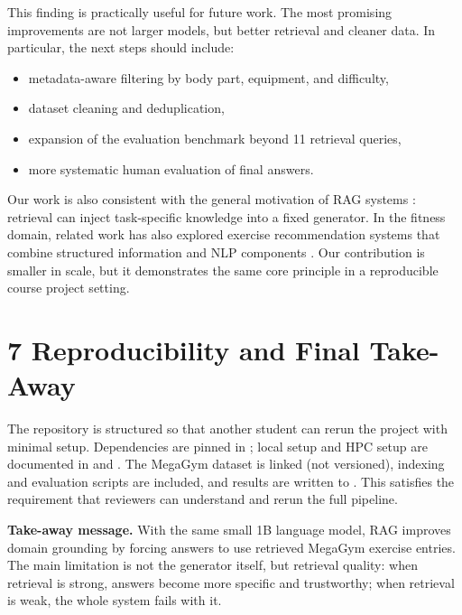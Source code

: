 \documentclass[fleqn,moreauthors,10pt]{ds_report}
\begin{document}
This finding is practically useful for future work. The most promising improvements are not larger models, but better retrieval and cleaner data. In particular, the next steps should include:

\begin{itemize}
\item metadata-aware filtering by body part, equipment, and difficulty,
\item dataset cleaning and deduplication,
\item expansion of the evaluation benchmark beyond 11 retrieval queries,
\item more systematic human evaluation of final answers.
\end{itemize}

Our work is also consistent with the general motivation of RAG systems \cite{Lewis2020}: retrieval can inject task-specific knowledge into a fixed generator. In the fitness domain, related work has also explored exercise recommendation systems that combine structured information and NLP components \cite{Yang2023}. Our contribution is smaller in scale, but it demonstrates the same core principle in a reproducible course project setting.

\section*{7 Reproducibility and Final Take-Away}

The repository is structured so that another student can rerun the project with minimal setup. Dependencies are pinned in ; local setup and HPC setup are documented in  and . The MegaGym dataset is linked (not versioned), indexing and evaluation scripts are included, and results are written to . This satisfies the requirement that reviewers can understand and rerun the full pipeline.

\textbf{Take-away message.} With the same small 1B language model, RAG improves domain grounding by forcing answers to use retrieved MegaGym exercise entries. The main limitation is not the generator itself, but retrieval quality: when retrieval is strong, answers become more specific and trustworthy; when retrieval is weak, the whole system fails with it.



\end{document}
